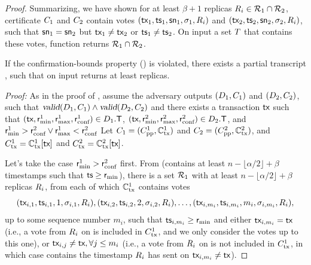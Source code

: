 \begin{proof}
	Summarizing, we have shown for at least $\beta + 1$ replicas $R_i \in \mathcal{R}_1 \cap \mathcal{R}_2$, certificate $C_1$ and $C_2$ contain votes $(\textsf{tx}_1, \textsf{ts}_1, \textsf{sn}_1, \sigma_1, R_i)$ and $(\textsf{tx}_2, \textsf{ts}_2, \textsf{sn}_2, \sigma_2, R_i)$, such that $\textsf{sn}_1 = \textsf{sn}_2$ but $\textsf{tx}_1 \neq \textsf{tx}_2$ or $\textsf{ts}_1 \neq \textsf{ts}_2$.
	On input a set $T$ that contains these votes, function \identify{\tran} returns $\mathcal{R}_1 \cap \mathcal{R}_2$.

	If the confirmation-bounds property () is violated, there exists a partial transcript \tran, such that  on input \tran returns at least \beta replicas.

	\noindent
	\emph{Proof:}
	As in the proof of , assume the adversary outputs $(D_1, C_1)$ and $(D_2, C_2)$, such that $\textsl{valid}(D_1, C_1) \land \textsl{valid}(D_2, C_2)$ and there exists a transaction $\textsf{tx}$ such that $(\textsf{tx}, \textsf{r}_\text{min}^1, \textsf{r}_\text{max}^1, \textsf{r}_\text{conf}^1) \in D_1.\textsf{T}$, $(\textsf{tx}, \textsf{r}_\text{min}^2, \textsf{r}_\text{max}^2, \textsf{r}_\text{conf}^2) \in D_2.\textsf{T}$, and $\textsf{r}_\text{min}^1 > \textsf{r}_\text{conf}^2 \lor \textsf{r}_\text{max}^1 < \textsf{r}_\text{conf}^2$
	Let $C_1 = (C_\text{pp}^1, \mathbb{C}_\text{tx}^1)$ and $C_2 = (C_\text{pp}^2, \mathbb{C}_\text{tx}^2)$, and $C_\text{tx}^1 = \mathbb{C}_\text{tx}^1[\textsf{tx}]$ and $C_\text{tx}^2 = \mathbb{C}_\text{tx}^2[\textsf{tx}]$.

	Let's take the case $\textsf{r}_\text{min}^1 > \textsf{r}_\text{conf}^2$ first. From  (\txVotesMin contains at least $n - \lfloor \alpha / 2 \rfloor + \beta$ timestamps \tsp such that $\textsf{ts} \geq \textsf{r}_\text{min}$), there is a set $\mathcal{R}_1$ with at least $n - \lfloor \alpha / 2 \rfloor + \beta$ replicas $R_i$, from each of which $\mathbb{C}_\text{tx}^1$ contains votes
	\begin{equation}\label{eq:proof-bounds-set1}
		(\textsf{tx}_{i,1}, \textsf{ts}_{i,1}, 1, \sigma_{i,1}, R_i), (\textsf{tx}_{i,2}, \textsf{ts}_{i,2}, 2, \sigma_{i,2}, R_i),
		\ldots, (\textsf{tx}_{i,m_i}, \textsf{ts}_{i, m_i}, m_i, \sigma_{i, m_i}, R_i),
	\end{equation}
	up to some sequence number $m_i$, such that $\textsf{ts}_{i, m_i} \geq \textsf{r}_\text{min}$ and either $\textsf{tx}_{i,m_i} = \textsf{tx}$ (i.e., a vote from $R_i$ on \tx is included in $C_\text{tx}^1$, and we only consider the votes up to this one), or  $\textsf{tx}_{i, j} \neq \textsf{tx}, \forall j \leq m_i$ (i.e., a vote from $R_i$ on \tx is not included in $C_\text{tx}^1$, in which case \txVotesMin contains the timestamp $R_i$ has sent on $\textsf{tx}_{i,m_i} \neq \textsf{tx}$).


\end{proof}
